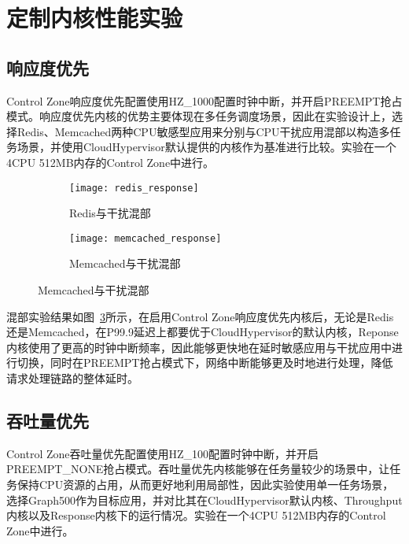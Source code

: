 \section{定制内核性能实验}

\subsection{响应度优先}


Control Zone响应度优先配置使用HZ\_1000配置时钟中断，并开启PREEMPT抢占模式。响应度优先内核的优势主要体现在多任务调度场景，因此在实验设计上，选择Redis、Memcached两种CPU敏感型应用来分别与CPU干扰应用混部以构造多任务场景，并使用CloudHypervisor默认提供的内核作为基准进行比较。实验在一个4CPU 512MB内存的Control Zone中进行。

\begin{figure}[H]
    \centering
    \begin{subfigure}[b]{0.45\textwidth}
      \texttt{[image: redis\_response]}
      \caption{Redis与干扰混部}
      \label{fig:redis_response}
    \end{subfigure}
    \begin{subfigure}[b]{0.45\textwidth}
      \texttt{[image: memcached\_response]}
      \caption{Memcached与干扰混部}
      \label{fig:memcached_response}
    \end{subfigure}
    \label{fig:lc_response}
  \end{figure}

混部实验结果如图~\ref{fig:lc_response}所示，在启用Control Zone响应度优先内核后，无论是Redis还是Memcached，在P99.9延迟上都要优于CloudHypervisor的默认内核，Reponse内核使用了更高的时钟中断频率，因此能够更快地在延时敏感应用与干扰应用中进行切换，同时在PREEMPT抢占模式下，网络中断能够更及时地进行处理，降低请求处理链路的整体延时。

\subsection{吞吐量优先}


Control Zone吞吐量优先配置使用HZ\_100配置时钟中断，并开启PREEMPT\_NONE抢占模式。吞吐量优先内核能够在任务量较少的场景中，让任务保持CPU资源的占用，从而更好地利用局部性，因此实验使用单一任务场景，选择Graph500作为目标应用，并对比其在CloudHypervisor默认内核、Throughput内核以及Response内核下的运行情况。实验在一个4CPU 512MB内存的Control Zone中进行。

